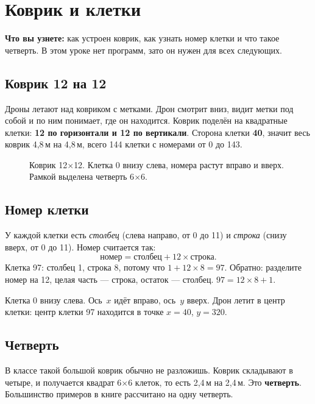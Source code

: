 \chapter{Коврик и клетки}\label{ch:kovrik}

\textbf{Что вы узнете:} как устроен коврик, как узнать номер клетки и что такое четверть. В этом уроке нет программ, зато он нужен для всех следующих.

\section{Коврик 12 на 12}

Дроны летают над ковриком с метками. Дрон смотрит вниз, видит метки под собой и по ним понимает, где он находится. Коврик поделён на квадратные клетки: \textbf{12 по горизонтали и 12 по вертикали}. Сторона клетки \textbf{40\cm}, значит весь коврик 4,8\,м на 4,8\,м, всего 144 клетки с номерами от 0 до 143.

\begin{figure}[tbp]
  \centering
  
  \caption{Коврик 12$\times$12. Клетка 0 внизу слева, номера растут вправо и вверх. Рамкой выделена четверть 6$\times$6.}\label{fig:mat}
\end{figure}

\section{Номер клетки}

У каждой клетки есть \emph{столбец} (слева направо, от 0 до 11) и \emph{строка} (снизу вверх, от 0 до 11). Номер считается так:
\[
  \text{номер} = \text{столбец} + 12 \times \text{строка}.
\]
Клетка 97: столбец 1, строка 8, потому что $1 + 12\times 8 = 97$. Обратно: разделите номер на 12, целая часть — строка, остаток — столбец. $97 = 12\times 8 + 1$.

Клетка 0 внизу слева. Ось~$x$ идёт вправо, ось~$y$ вверх. Дрон летит в центр клетки: центр клетки 97 находится в точке $x = 40$\cm, $y = 320$\cm.

\section{Четверть}

В классе такой большой коврик обычно не разложишь. Коврик складывают в четыре, и получается квадрат 6$\times$6 клеток, то есть 2,4\,м на 2,4\,м. Это \textbf{четверть}. Большинство примеров в книге рассчитано на одну четверть.

